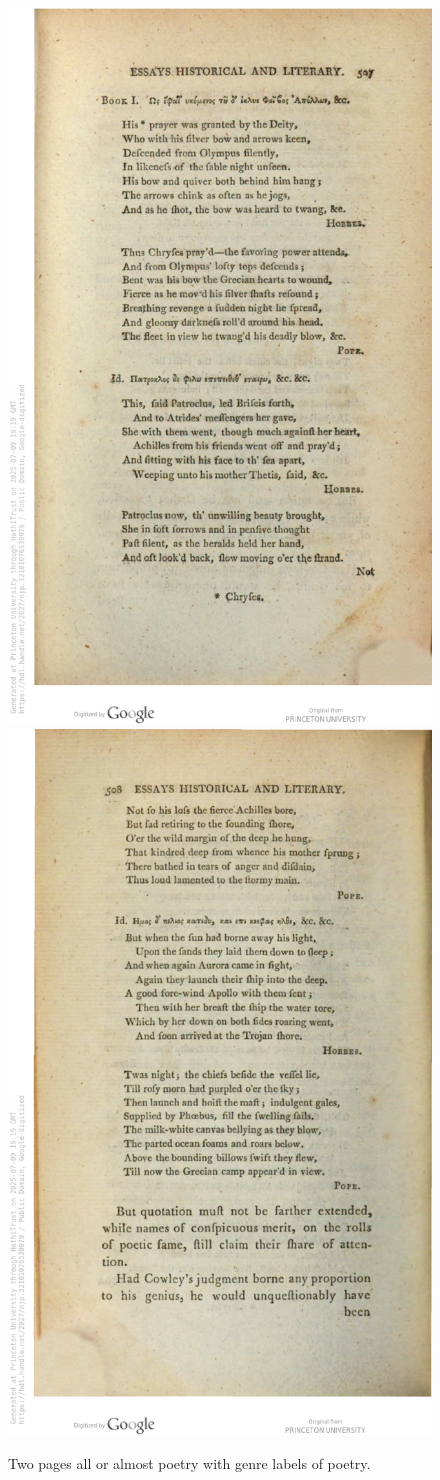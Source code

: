 \documentclass{anthology-ch}         %
\begin{document}
\begin{figure}[t!]
  \centering
  \includegraphics[width=0.4\linewidth]{figures/hathi-pages/njp-32101076530979-515-1752088772.pdf}
  \includegraphics[width=0.4\linewidth]{figures/hathi-pages/njp-32101076530979-516-1752088741.pdf}
  \caption{Two pages all or almost poetry with genre labels of poetry.}
  \label{fig:poetry_pages}
\end{figure}
\end{document}
